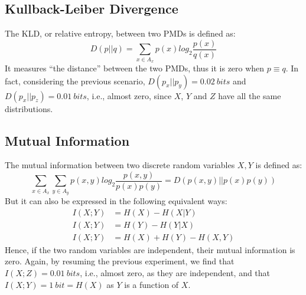 \documentclass[a4paper]{article}
\begin{document}
	\subsection{Kullback-Leiber Divergence}
	The KLD, or relative entropy, between two PMDs is defined as:
	\begin{equation}
		D(p||q) = \sum_{x \in A_x}p(x)log_2\frac{p(x)}{q(x)}
	\end{equation}
	It measures ``the distance'' between the two PMDs, thus it is zero when $ p\equiv q$. In fact, considering the previous scenario, $ D(p_x||p_y)=0.02\ bits$ and $ D(p_x||p_z) = 0.01\ bits$, i.e., almost zero, since $ X $, $ Y $ and $ Z $ have all the same distributions.  
	\subsection{Mutual Information}
	The mutual information between two discrete random variables $ X,Y $ is defined as:
	\begin{equation}
		\sum_{x \in A_x} \sum_{y\in A_y} p(x,y)log_2\frac{p(x,y)}{p(x)p(y)} = D(p(x,y)||p(x)p(y))
	\end{equation}
	But it can also be expressed in the following equivalent ways:
	\begin{align}
		I(X;Y) &= H(X)-H(X|Y) \\
		I(X;Y) &= H(Y)-H(Y|X) \\
		I(X;Y) &= H(X)+H(Y)-H(X,Y)
	\end{align}
	Hence, if the two random variables are independent, their mutual information is zero. Again, by resuming the previous experiment, we find that $ I(X;Z) = 0.01\ bits $, i.e., almost zero, as they are independent, and that $ I(X;Y) = 1\ bit = H(X)$ as $ Y $ is a function of $ X $.
\end{document}
